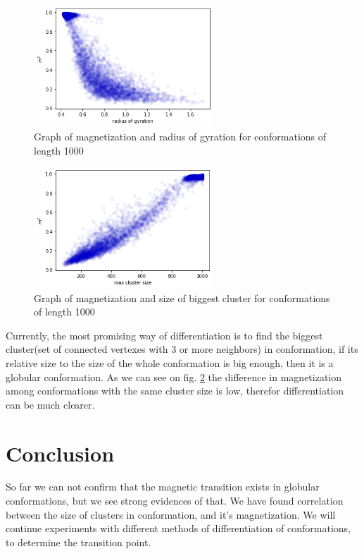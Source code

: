 \documentclass[a4paper,12pt]{article}
\begin{document}
\begin{figure}
	\centering
	\includegraphics[width=0.6\textwidth]{images/mag2_to_R_L1000.png} 
	\caption{Graph of magnetization and radius of gyration for conformations of length 1000}
	\label{fig:radius}
\end{figure}

\begin{figure}
	\centering
	\includegraphics[width=0.6\textwidth]{images/mag_from_cluster_size.png} 
	\caption{Graph of magnetization and size of biggest cluster for conformations of length 1000}
	\label{fig:cluster_mag}
\end{figure}

Currently, the most promising way of differentiation is to find the biggest cluster(set of connected vertexes with 3 or more neighbors) in conformation, if its relative size to the size of the whole conformation is big enough, then it is a globular conformation. As we can see on fig. \ref{fig:cluster_mag} the difference in magnetization among conformations with the same cluster size is low, therefor differentiation can be much clearer.
	

\section*{Conclusion}
So far we can not confirm that the magnetic transition exists in globular conformations, but we see strong evidences of that. We have found correlation between the size of clusters in conformation, and it's magnetization.  We will continue experiments with different methods of differentiation of conformations, to determine the transition point.
\end{document}
